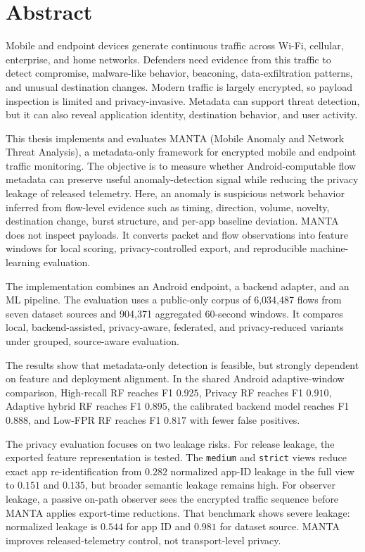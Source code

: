\chapter*{Abstract}

Mobile and endpoint devices generate continuous traffic across Wi-Fi, cellular, enterprise, and home
networks. Defenders need evidence from this traffic to detect compromise, malware-like behavior,
beaconing, data-exfiltration patterns, and unusual destination changes. Modern traffic is largely
encrypted, so payload inspection is limited and privacy-invasive. Metadata can support threat
detection, but it can also reveal application identity, destination behavior, and user activity.

This thesis implements and evaluates MANTA (Mobile Anomaly and Network Threat Analysis), a
metadata-only framework for encrypted mobile and endpoint traffic monitoring. The objective is to
measure whether Android-computable flow metadata can preserve useful anomaly-detection signal while
reducing the privacy leakage of released telemetry. Here, an anomaly is suspicious network behavior
inferred from flow-level evidence such as timing, direction, volume, novelty, destination change,
burst structure, and per-app baseline deviation. MANTA does not inspect payloads. It converts packet
and flow observations into feature windows for local scoring, privacy-controlled export, and
reproducible machine-learning evaluation.

The implementation combines an Android endpoint, a backend adapter, and an ML pipeline. The
evaluation uses a public-only corpus of 6,034,487 flows from seven dataset sources and 904,371
aggregated 60-second windows. It compares local, backend-assisted, privacy-aware, federated, and
privacy-reduced variants under grouped, source-aware evaluation.

The results show that metadata-only detection is feasible, but strongly dependent on feature and
deployment alignment. In the shared Android adaptive-window comparison, High-recall RF reaches F1
\(0.925\), Privacy RF reaches F1 \(0.910\), Adaptive hybrid RF reaches F1 \(0.895\), the
calibrated backend model reaches F1 \(0.888\), and Low-FPR RF reaches F1 \(0.817\) with fewer false
positives.

The privacy evaluation focuses on two leakage risks. For release leakage, the exported feature
representation is tested. The \texttt{medium} and \texttt{strict} views reduce exact app
re-identification from \(0.282\) normalized app-ID leakage in the full view to \(0.151\) and
\(0.135\), but broader semantic leakage remains high. For observer leakage, a passive on-path observer sees the encrypted traffic sequence before MANTA
applies export-time reductions. That benchmark shows severe leakage: normalized leakage is \(0.544\)
for app ID and \(0.981\) for dataset source. MANTA improves released-telemetry control, not transport-level privacy.
